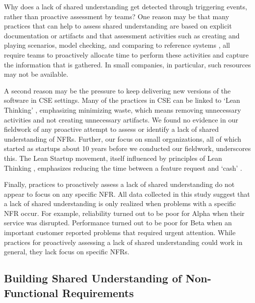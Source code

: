 \documentclass[smallextended]{svjour3}
\begin{document}
Why does a lack of shared understanding get detected through triggering events, rather than proactive assessment by teams?
One reason may be that many practices that can help to assess shared understanding are based on explicit documentation or artifacts \citep{glinz_shared_2015} and that assessment activities such as 
creating and playing scenarios, model checking, and comparing to reference systems \citep{glinz_shared_2015}, 
all require teams to proactively allocate time to perform these activities and capture the information that is gathered. In small companies, in particular, such resources may not be available.

A second reason may be the pressure to keep delivering new versions of the software in CSE settings. Many of the practices in CSE can be linked to `Lean Thinking' \citep{fitzgerald2017continuous}, emphasizing minimizing waste, which means removing unnecessary activities and not creating unnecessary artifacts. We found no evidence in our fieldwork of any proactive attempt to assess or identify a lack of shared understanding of NFRs. 
Further, our focus on small organizations, all of which started as startups about 10 years before we conducted our fieldwork, underscores this. The Lean Startup movement, itself influenced by principles of Lean Thinking \citep{ries_lean_2011}, emphasizes reducing the time between a feature request and `cash' \citep{fitzgerald2017continuous}. 

Finally, practices to proactively assess a lack of shared understanding do not appear to focus on any specific NFR. All data collected in this study suggest that a lack of shared understanding is only realized when problems with a specific NFR occur. For example, reliability turned out to be poor for Alpha when their service was disrupted. Performance turned out to be poor for Beta when an important customer reported problems that required urgent attention.
While practices for proactively assessing a lack of shared understanding could work in general, they lack focus on specific NFRs.








\subsection{Building Shared Understanding of Non-Functional Requirements}
\end{document}
